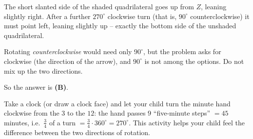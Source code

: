 {
The short slanted side of the shaded quadrilateral goes up from $Z$, leaning slightly right. After a further $270^\circ$ clockwise turn (that is, $90^\circ$ counterclockwise) it must point left, leaning slightly up -- exactly the bottom side of the unshaded quadrilateral.
\begin{warnbox}Rotating \emph{counterclockwise} would need only $90^\circ$, but the problem asks for clockwise (the direction of the arrow), and $90^\circ$ is not among the options. Do not mix up the two directions.\end{warnbox}
So the answer is \textbf{(B)}.
\begin{parentbox}Take a clock (or draw a clock face) and let your child turn the minute hand clockwise from the $3$ to the $12$: the hand passes $9$ ``five-minute steps'' $=45$ minutes, i.e.\ $\frac34$ of a turn $=\frac34\cdot360^\circ=270^\circ$. This activity helps your child feel the difference between the two directions of rotation.\end{parentbox}
}

